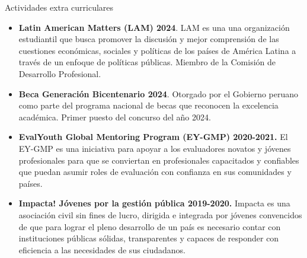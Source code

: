 \documentclass{resume} %
\begin{document}
\begin{rSection}{Actividades extra curriculares} 
\begin{itemize}
    \item \textbf{Latin American Matters (LAM) 2024}. LAM es una una organización estudiantil que busca promover la discusión y mejor comprensión de las cuestiones económicas, sociales y políticas de los países de América Latina a través de un enfoque de políticas públicas. Miembro de la Comisión de Desarrollo Profesional.
    \item \textbf{Beca Generación Bicentenario 2024}. Otorgado por el Gobierno peruano como parte del programa nacional de becas que reconocen la excelencia académica. Primer puesto del concurso del año 2024.
    \item 	\textbf{EvalYouth Global Mentoring Program (EY-GMP) 2020-2021.} {El EY-GMP es una iniciativa para apoyar a los evaluadores novatos y jóvenes profesionales para que se conviertan en profesionales capacitados y confiables que puedan asumir roles de evaluación con confianza en sus comunidades y países.}
    \item 	\textbf{Impacta! Jóvenes por la gestión pública 2019-2020.} {Impacta es una asociación civil sin fines de lucro, dirigida e integrada por jóvenes convencidos de que para lograr el pleno desarrollo de un país es necesario contar con instituciones públicas sólidas, transparentes y capaces de responder con eficiencia a las necesidades de sus ciudadanos.}
  \end{itemize}


\end{rSection}


   
\end{document}
